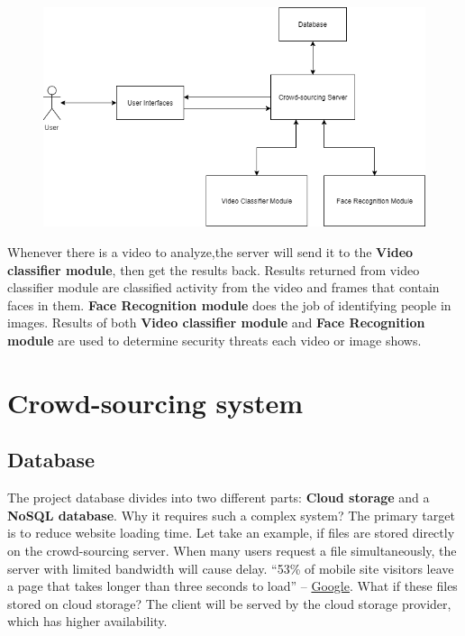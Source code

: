 \begin{center}
    \begin{figure}[H]
    \centering
    \includegraphics[width=1\columnwidth]{images/chap3/system_overview_basic.png}
    \label{chap3:system_overview_basic}
    \end{figure}
\end{center}
Whenever there is a video to analyze,the server will send it to the \textbf{Video classifier module}, then get the results back. Results returned from video classifier module are classified activity from the video and frames that contain faces in them. \textbf{Face Recognition module} does the job of identifying people in images. Results of both \textbf{Video classifier module} and \textbf{Face Recognition module} are used to determine security threats each video or image shows.
\section{Crowd-sourcing system}
\subsection{Database}
The project database divides into two different parts: \textbf{Cloud storage} and a \textbf{NoSQL database}. Why it requires such a complex system? The primary target is to reduce website loading time. Let take an example, if files are stored directly on the crowd-sourcing server. When many users request a file simultaneously, the server with limited bandwidth will cause delay. “53\% of mobile site visitors leave a page that takes longer than three seconds to load” – \href{https://think.storage.googleapis.com/docs/mobile-page-speed-new-industry-benchmarks.pdf}{Google}. What if these files stored on cloud storage? The client will be served by the cloud storage provider, which has higher availability.
